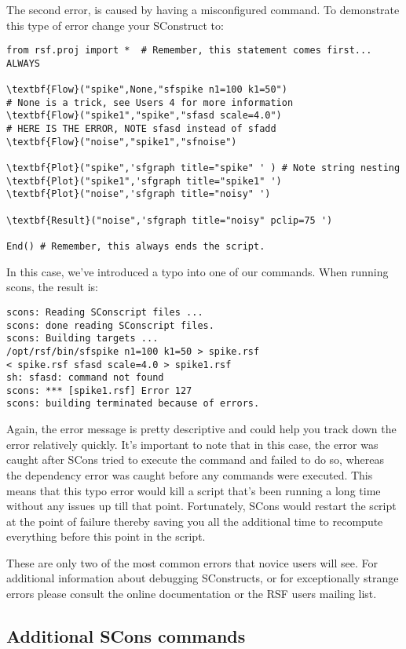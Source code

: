 The second error, is caused by having a misconfigured command.  To demonstrate this type of error change your SConstruct to:

\begin{verbatim}
from rsf.proj import *  # Remember, this statement comes first... ALWAYS

\textbf{Flow}("spike",None,"sfspike n1=100 k1=50") 
# None is a trick, see Users 4 for more information
\textbf{Flow}("spike1","spike","sfasd scale=4.0") 
# HERE IS THE ERROR, NOTE sfasd instead of sfadd
\textbf{Flow}("noise","spike1","sfnoise")

\textbf{Plot}("spike",'sfgraph title="spike" ' ) # Note string nesting
\textbf{Plot}("spike1",'sfgraph title="spike1" ') 
\textbf{Plot}("noise",'sfgraph title="noisy" ')

\textbf{Result}("noise",'sfgraph title="noisy" pclip=75 ')

End() # Remember, this always ends the script.
\end{verbatim}
In this case, we've introduced a typo into one of our commands.  When running scons, the result is:
\begin{verbatim}
scons: Reading SConscript files ...
scons: done reading SConscript files.
scons: Building targets ...
/opt/rsf/bin/sfspike n1=100 k1=50 > spike.rsf
< spike.rsf sfasd scale=4.0 > spike1.rsf
sh: sfasd: command not found
scons: *** [spike1.rsf] Error 127
scons: building terminated because of errors.
\end{verbatim}
Again, the error message is pretty descriptive and could help you track down the error relatively quickly.  It's important to note that in this case, the error was caught after SCons tried to execute the command and failed to do so, whereas the dependency error was caught before any commands were executed.  This means that this typo error would kill a script that's been running a long time without any issues up till that point.  Fortunately, SCons would restart the script at the point of failure thereby saving you all the additional time to recompute everything before this point in the script.

These are only two of the most common errors that novice users will see.  For additional information about debugging SConstructs, or for exceptionally strange errors please consult the online documentation or the RSF users mailing list.

\subsection{Additional SCons commands}

